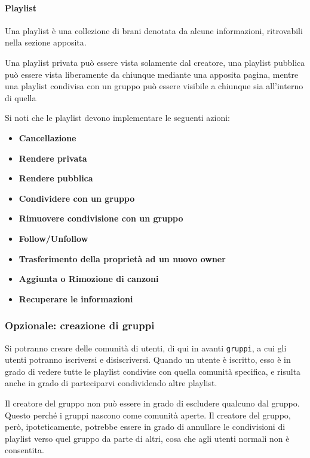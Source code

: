 \paragraph{Playlist} Una playlist è una collezione di brani denotata da alcune informazioni, ritrovabili nella sezione apposita.

Una playlist privata può essere vista solamente dal creatore, una playlist pubblica può essere vista liberamente da chiunque mediante una apposita pagina, mentre una playlist condivisa con un gruppo può essere visibile a chiunque sia all'interno di quella 

Si noti che le playlist devono implementare le seguenti azioni:\begin{itemize}
    \item \textbf{Cancellazione}
    \item \textbf{Rendere privata}
    \item \textbf{Rendere pubblica}
    \item \textbf{Condividere con un gruppo}
    \item \textbf{Rimuovere condivisione con un gruppo}
    \item \textbf{Follow/Unfollow}
    \item \textbf{Trasferimento della proprietà ad un nuovo owner}
    \item \textbf{Aggiunta o Rimozione di canzoni}
    \item \textbf{Recuperare le informazioni}
\end{itemize}
\subsubsection{Opzionale: creazione di gruppi}
Si potranno creare delle comunità di utenti, di qui in avanti \verb|gruppi|, a cui gli utenti potranno iscriversi e disiscriversi. Quando un utente è iscritto, esso è in grado di vedere tutte le playlist condivise con quella comunità specifica, e risulta anche in grado di parteciparvi condividendo altre playlist.

Il creatore del gruppo non può essere in grado di escludere qualcuno dal gruppo. Questo perché i gruppi nascono come comunità aperte. Il creatore del gruppo, però, ipoteticamente, potrebbe essere in grado di annullare le condivisioni di playlist verso quel gruppo da parte di altri, cosa che agli utenti normali non è consentita.
\newpage